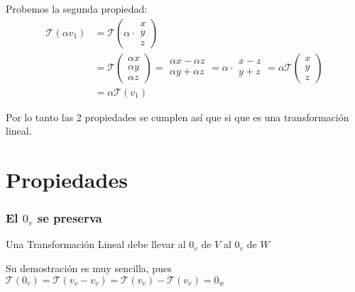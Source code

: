 \documentclass[12pt]{report}                                %
\begin{document}
            Probemos la segunda propiedad:
            \begin{equation*}
            \begin{split}
                \mathscr{T} (\alpha v_1) & =
                \mathscr{T} \left( \alpha \cdot \begin{matrix} x\\y\\z \end{matrix} \right) \\
                & = \mathscr{T} \left( \begin{matrix} \alpha x\\ \alpha y\\ \alpha z\end{matrix} \right) =
                \begin{matrix} \alpha x - \alpha z\\ \alpha y + \alpha z\end{matrix}  =
                \alpha \cdot \begin{matrix}x-z\\y+z\end{matrix} =
                \alpha \mathscr{T} \left( \begin{matrix}x\\y\\z\end{matrix} \right) \\
                & = \alpha \mathscr{T}(v_1)
            \end{split}
            \end{equation*}

        Por lo tanto las 2 propiedades se cumplen así que si que es una transformación lineal.


    \clearpage
    \section{Propiedades}

        \subsubsection{El $0_v$ se preserva}
            Una Transformación Lineal debe llevar al $0_v$ de $V$ al $0_v$ de $W$

            Su demostración es muy sencilla, pues
            $\mathscr{T}(0_v)=\mathscr{T}(v_v-v_v)=\mathscr{T}(v_v)-\mathscr{T}(v_v)=0_w$
\end{document}
